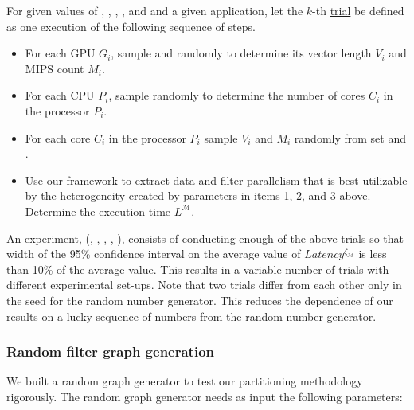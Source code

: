 For given values of \numtplgynodes, \gpunum, \veclenset, \corenumset, \mipsset
and \bw and a given application, let the $k$-th \ul{trial} be
defined as one execution of the following sequence of steps.

\begin{itemize}

\item For each GPU $G_i$, sample \veclenset and \mipsset randomly to
  determine its vector length $V_i$ and MIPS count $M_i$. \label{i1}

\item For each CPU $P_i$, sample \corenumset randomly to determine the
  number of cores $C_i$ in the processor $P_i$.~\label{i2}

\item For each core $C_i$ in the processor $P_i$ sample $V_i$ and $M_i$
  randomly from set \veclenset and \mipsset.

\item Use our framework to extract data and filter parallelism that is
  best utilizable by the heterogeneity created by parameters in items 1,
  2, and 3 above. Determine the execution time
  $L^{\mathcal{M}}$.

\end{itemize}

An experiment, \expt(\numtplgynodes, \gpunum, \veclenset, \corenumset
\mipsset, \bw), consists of conducting enough of the above trials so that
width of the 95\% confidence interval on the average value of
$Latency^{\zeta_\mathcal{M}}$ is less than 10\% of the average
value. This results in a variable number of trials with different
experimental set-ups. Note that two trials differ from each other only
in the seed for the random number generator.  This reduces the
dependence of our results on a lucky sequence of numbers from the random
number generator.

\subsubsection{Random filter graph generation}
\label{sec:filter-graph-setup}

We built a random graph generator to test our partitioning methodology
rigorously. The random graph generator needs as input the following
parameters:

